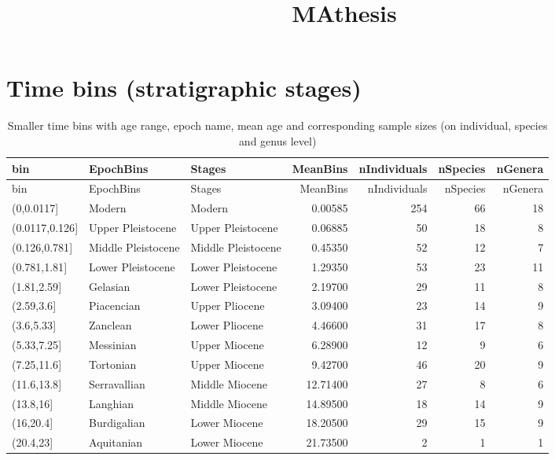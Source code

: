 \documentclass[]{article}
\title{MAthesis}
\author{}
\date{}
\begin{document}
\maketitle

{
\setcounter{tocdepth}{2}
\tableofcontents
}
\section{Time bins (stratigraphic
stages)}\label{time-bins-stratigraphic-stages}

\begin{longtable}[]{@{}lllrrrr@{}}
\caption{Smaller time bins with age range, epoch name, mean age and
corresponding sample sizes (on individual, species and genus
level)}\tabularnewline
\toprule
bin & EpochBins & Stages & MeanBins & nIndividuals & nSpecies &
nGenera\tabularnewline
\midrule
\endfirsthead
\toprule
bin & EpochBins & Stages & MeanBins & nIndividuals & nSpecies &
nGenera\tabularnewline
\midrule
\endhead
(0,0.0117{]} & Modern & Modern & 0.00585 & 254 & 66 & 18\tabularnewline
(0.0117,0.126{]} & Upper Pleistocene & Upper Pleistocene & 0.06885 & 50
& 18 & 8\tabularnewline
(0.126,0.781{]} & Middle Pleistocene & Middle Pleistocene & 0.45350 & 52
& 12 & 7\tabularnewline
(0.781,1.81{]} & Lower Pleistocene & Lower Pleistocene & 1.29350 & 53 &
23 & 11\tabularnewline
(1.81,2.59{]} & Gelasian & Lower Pleistocene & 2.19700 & 29 & 11 &
8\tabularnewline
(2.59,3.6{]} & Piacencian & Upper Pliocene & 3.09400 & 23 & 14 &
9\tabularnewline
(3.6,5.33{]} & Zanclean & Lower Pliocene & 4.46600 & 31 & 17 &
8\tabularnewline
(5.33,7.25{]} & Messinian & Upper Miocene & 6.28900 & 12 & 9 &
6\tabularnewline
(7.25,11.6{]} & Tortonian & Upper Miocene & 9.42700 & 46 & 20 &
9\tabularnewline
(11.6,13.8{]} & Serravallian & Middle Miocene & 12.71400 & 27 & 8 &
6\tabularnewline
(13.8,16{]} & Langhian & Middle Miocene & 14.89500 & 18 & 14 &
9\tabularnewline
(16,20.4{]} & Burdigalian & Lower Miocene & 18.20500 & 29 & 15 &
9\tabularnewline
(20.4,23{]} & Aquitanian & Lower Miocene & 21.73500 & 2 & 1 &
1\tabularnewline
\bottomrule
\end{longtable}
\end{document}
